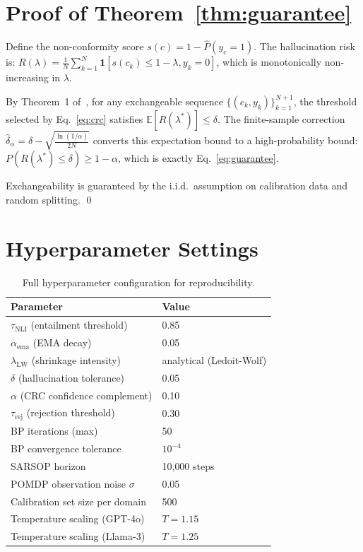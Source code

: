 \documentclass[conference]{IEEEtran}
\begin{document}
\section{Proof of Theorem~\ref{thm:guarantee}}
\label{app:proofC}

Define the non-conformity score
$s(c) = 1 - \hat{P}(y_c = 1)$.
The hallucination risk is:
$R(\lambda) = \frac{1}{N}\sum_{k=1}^N \mathbf{1}[s(c_k) \leq 1-\lambda, y_k = 0]$,
which is monotonically non-increasing in $\lambda$.

By Theorem~1 of~\citet{angelopoulos2022crc}, for any
exchangeable sequence $\{(c_k, y_k)\}_{k=1}^{N+1}$,
the threshold selected by Eq.~\eqref{eq:crc} satisfies
$\mathbb{E}[R(\lambda^*)] \leq \delta$.
The finite-sample correction
$\hat{\delta}_\alpha = \delta - \sqrt{\frac{\ln(1/\alpha)}{2N}}$
converts this expectation bound to a
high-probability bound: $P(R(\lambda^*) \leq \delta) \geq 1 - \alpha$,
which is exactly Eq.~\eqref{eq:guarantee}.

Exchangeability is guaranteed by the i.i.d.\ assumption
on calibration data and random splitting. \qed

\section{Hyperparameter Settings}
\label{app:hyperparams}

\begin{table}[h]
\caption{Full hyperparameter configuration for reproducibility.}
\label{tab:hyperparams}
\centering
\begin{tabular}{ll}
\toprule
Parameter & Value \\
\midrule
$\tau_\text{NLI}$ (entailment threshold)    & 0.85 \\
$\alpha_\text{ema}$ (EMA decay)             & 0.05 \\
$\lambda_\text{LW}$ (shrinkage intensity)   & analytical (Ledoit-Wolf) \\
$\delta$ (hallucination tolerance)          & 0.05 \\
$\alpha$ (CRC confidence complement)        & 0.10 \\
$\tau_\text{rej}$ (rejection threshold)     & 0.30 \\
BP iterations (max)                         & 50 \\
BP convergence tolerance                    & $10^{-4}$ \\
SARSOP horizon                              & 10{,}000 steps \\
POMDP observation noise $\sigma$            & 0.05 \\
Calibration set size per domain             & 500 \\
Temperature scaling (GPT-4o)               & $T = 1.15$ \\
Temperature scaling (Llama-3)              & $T = 1.25$ \\
\bottomrule
\end{tabular}
\end{table}
\end{document}
